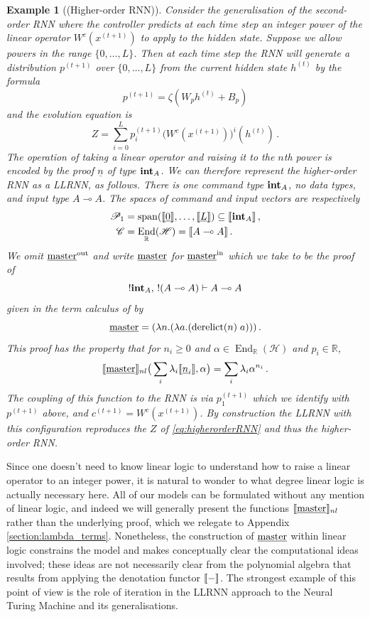 \documentclass[english,letter paper,12pt,leqno]{article}
\theoremstyle{example}
\newtheorem{example}[theorem]{Example}
\numberwithin{equation}{section}
\def\be{\begin{equation}}
\def\ee{\end{equation}}
\DeclareMathOperator{\End}{End}
\DeclareMathOperator{\derelict}{derelict}
\begin{document}
\begin{example}[(Higher-order RNN)] Consider the generalisation of the second-order RNN where the controller predicts at each time step an integer power of the linear operator $W^c(x^{(t+1)})$ to apply to the hidden state. Suppose we allow powers in the range $\{0,\ldots,L\}$. Then at each time step the RNN will generate a distribution $p^{(t+1)}$ over $\{0,\ldots,L\}$ from the current hidden state $h^{(t)}$ by the formula
\[
p^{(t+1)} = \zeta( W_p h^{(t)} + B_p )
\]
and the evolution equation is
\be\label{eq:higherorderRNN}
Z = \sum_{i=0}^L p_i^{(t+1)} \big( W^c(x^{(t+1)}) \big)^i(h^{(t)})\,.
\ee
The operation of taking a linear operator and raising it to the $n$th power is encoded by the proof $\underline{n}$ of type $\textbf{int}_A$. We can therefore represent the higher-order RNN as a LLRNN, as follows. There is one command type $\textbf{int}_A$, no data types, and input type $A \multimap A$. The spaces of command and input vectors are respectively
\begin{align*}
\mathscr{P}_1 &= \operatorname{span}(\den{\underline{0}}, \ldots, \den{\underline{L}}) \subseteq \den{\inta_A}\,,\\
\mathscr{C} &= \End_{\mathbb{R}}(\mathscr{H}) = \den{A \multimap A}\,.
\end{align*}
We omit $\underline{\textup{master}}^{\mathrm{out}}$ and write $\underline{\textup{master}}$ for $\underline{\textup{master}}^{\mathrm{in}}$ which we take to be the proof of
\[
{!}\textbf{int}_A, \, {!}(A \multimap A) \vdash A \multimap A
\]
given in the term calculus of \cite{benton_etal} by
\[
\master = (\lambda n. (\lambda a. (\derelict(n) \; a)))\,.
\]
This proof has the property that for $n_i \ge 0$ and $\alpha \in \End_{\mathbb{R}}(\mathscr{H})$ and $p_i \in \mathbb{R}$,
\be
\den{\master}_{nl}\big( \sum_i \lambda_i \den{\underline{n}_i}, \alpha \big) = \sum_i \lambda_i \alpha^{n_i}\,.
\ee
The coupling of this function to the RNN is via $p_1^{(t+1)}$ which we identify with $p^{(t+1)}$ above, and $c^{(t+1)} = W^c(x^{(t+1)})$. By construction the LLRNN with this configuration reproduces the $Z$ of \eqref{eq:higherorderRNN} and thus the higher-order RNN.
\end{example}

Since one doesn't need to know linear logic to understand how to raise a linear operator to an integer power, it is natural to wonder to what degree linear logic is actually necessary here. All of our models can be formulated without any mention of linear logic, and indeed we will generally present the functions $\llbracket \underline{\textup{master}} \rrbracket_{nl}$ rather than the underlying proof, which we relegate to Appendix \ref{section:lambda_terms}. Nonetheless, the construction of $\underline{\textup{master}}$ within linear logic constrains the model and makes conceptually clear the computational ideas involved; these ideas are not necessarily clear from the polynomial algebra that results from applying the denotation functor $\llbracket - \rrbracket$. The strongest example of this point of view is the role of iteration in the LLRNN approach to the Neural Turing Machine and its generalisations.
\end{document}
